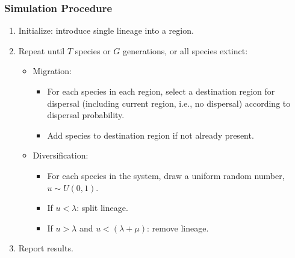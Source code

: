 \documentclass[11pt,t]{beamer}
\begin{document}
\begin{frame}
	\frametitle{Simulation Procedure}
	\begin{enumerate}
		\item Initialize: introduce single lineage into a region.
		\item Repeat until $T$ species or $G$ generations, or all species extinct:
			\begin{itemize}
				\item Migration:			
				\begin{itemize} 
					\item For each species in each region, select a destination region for dispersal (including current region, i.e., no dispersal) according to dispersal probability.
					\item Add species to destination region if not already present.
				\end{itemize}
			
				\item Diversification:
				\begin{itemize}	 
					\item For each species in the system, draw a uniform random number, $u \sim U(0,1)$.					
					\item If $u < \lambda$: split lineage.
					\item If $u > \lambda$ and $u < (\lambda + \mu)$: remove lineage.
				\end{itemize}	
			\end{itemize}
		\item Report results.					
	\end{enumerate}
\end{frame}
\end{document}
